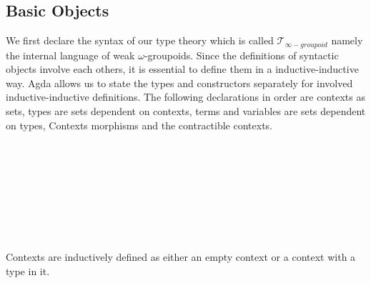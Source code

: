 \documentclass{acm_proc_article-sp}
\newcommand{\wog}{weak $\omega$-groupoids}
\newcommand{\tig}{$\mathcal{T}_{\infty-groupoid}$}
\begin{document}


\subsection{Basic Objects}

We first declare the syntax of our type theory which is
called \tig{} namely the internal language of \wog. Since the definitions of syntactic objects involve each others, it is essential to define them in a inductive-inductive way. Agda allows us to state the types and constructors separately for involved inductive-inductive definitions. The following declarations in order are contexts as sets,
types are sets dependent on contexts, terms and variables are sets
dependent on types, Contexts morphisms and the contractible contexts.

\begin{code}\>\<%
\\
\>  \<[19]%
\>[19]\AgdaSymbol{:} \<%
\\
\>  \AgdaSymbol{(} \AgdaSymbol{:} \AgdaSymbol{)} \<[19]%
\>[19]\AgdaSymbol{:} \<%
\\
\>  \<[19]%
\>[19]\AgdaSymbol{:} \AgdaSymbol{\{} \AgdaSymbol{:} \AgdaSymbol{\}(} \AgdaSymbol{:}  \AgdaSymbol{)}  \<%
\\
\>  \<[19]%
\>[19]\AgdaSymbol{:} \AgdaSymbol{\{} \AgdaSymbol{:} \AgdaSymbol{\}(} \AgdaSymbol{:}  \AgdaSymbol{)}  \<%
\\
\>  \<[19]%
\>[19]\AgdaSymbol{:}     \<%
\\
\>  \<[19]%
\>[19]\AgdaSymbol{:}   \<%
\\
\>\<\end{code}
Contexts are inductively defined as either an empty context or
a context with a type in it.
\end{document}
